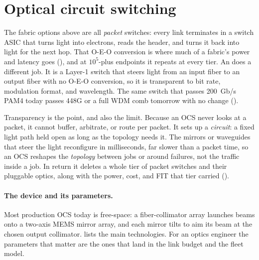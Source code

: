 \section{Optical circuit switching}
\label{sec:ocs}

The fabric options above are all \emph{packet} switches: every link terminates in a
switch ASIC that turns light into electrons, reads the header, and turns it back into
light for the next hop. That O-E-O conversion is where much of a fabric's power and
latency goes (), and at $10^5$-plus endpoints it repeats at every tier.
An  does a different job. It is a Layer-1
switch that steers light from an input fiber to an output fiber with no O-E-O
conversion, so it is transparent to bit rate, modulation format, and wavelength. The
same switch that passes 200~Gb/s PAM4 today passes 448G or a full WDM comb tomorrow with
no change ().

Transparency is the point, and also the limit. Because an OCS never looks at a packet, it
cannot buffer, arbitrate, or route per packet. It sets up a \emph{circuit}: a fixed light
path held open as long as the topology needs it. The mirrors or waveguides that steer the
light reconfigure in milliseconds, far slower than a packet time, so an OCS reshapes the
\emph{topology} between jobs or around failures, not the traffic inside a job. In return
it deletes a whole tier of packet switches and their pluggable optics, along with the
power, cost, and FIT that tier carried ().

\paragraph{The device and its parameters.}
Most production OCS today is free-space: a fiber-collimator array launches beams onto a
two-axis MEMS mirror array, and each mirror tilts to aim its beam at the chosen output
collimator.  lists the main technologies. For an optics engineer the
parameters that matter are the ones that land in the link budget and the fleet model.

